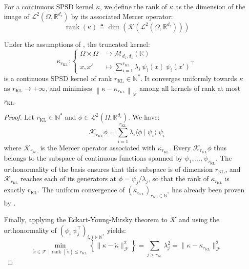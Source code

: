 \begin{proposition}\label{th:reduced_rank}
	For a continuous SPSD kernel $\kappa$, we define the rank of $\kappa$ as the dimension of the image of $\mathcal{L}^2(\Omega,\mathbb{R}^{d_z})$ by its associated Mercer operator:
	\begin{equation}
		\operatorname{rank}(\kappa)\triangleq\operatorname{dim}\left(\mathcal{K}\left(\mathcal{L}^2(\Omega,\mathbb{R}^{d_z})\right)\right)
	\end{equation}

	Under the assumptions of , the truncated kernel:
	\begin{equation}
		\kappa_{r_{\mathrm{KL}}}:\left\{\begin{aligned}
		\Omega\times\Omega&\to\mathcal{M}_{d_z,d_z}(\mathbb{R})\\
		x,x'&\mapsto\sum_{i=1}^{r_{\mathrm{KL}}}\lambda_i\:\psi_i(x)\:\psi_i(x')^\top
		\end{aligned}\right.
	\end{equation}
	is a continuous SPSD kernel of rank $r_{\mathrm{KL}}\in\mathbb{N}^*$. It converges uniformly towards $\kappa$ as $r_{\mathrm{KL}}\to+\infty$, and minimises $\left\|\kappa-\kappa_{r_{\mathrm{KL}}}\right\|_{\mathcal{F}}$ among all kernels of rank at most $r_{\mathrm{KL}}$.
\end{proposition}

\begin{proof}
	Let $r_{\mathrm{KL}}\in\mathbb{N}^*$ and $\phi\in\mathcal{L}^2(\Omega,\mathbb{R}^{d_z})$. We have:
	\begin{equation}
		\mathcal{K}_{r_{\mathrm{KL}}}\phi=\sum_{i=1}^{r_{\mathrm{KL}}}\lambda_i\langle\phi\mid\psi_i\rangle\:\psi_i
	\end{equation}
	where $\mathcal{K}_{r_{\mathrm{KL}}}$ is the Mercer operator associated with $\kappa_{r_{\mathrm{KL}}}$. Every $\mathcal{K}_{r_{\mathrm{KL}}}\phi$ thus belongs to the subspace of continuous functions spanned by $\psi_1,\dots,\psi_{r_{\mathrm{KL}}}$. The orthonormality of the basis ensures that this subspace is of dimension $r_{\mathrm{KL}}$, and $\mathcal{K}_{r_{\mathrm{KL}}}$ reaches each of its generators at $\phi=\psi_j/\lambda_j$, so that the rank of $\kappa_{r_{\mathrm{KL}}}$ is exactly $r_{\mathrm{KL}}$. The uniform convergence of $(\kappa_{r_{\mathrm{KL}}})_{r_{\mathrm{KL}}\in\mathbb{N}^*}$ has already been proven by .

	Finally, applying the Eckart-Young-Mirsky theorem \cite{bib:Eckart-Young,bib:Mirsky} to $\mathcal{K}$ and using the orthonormality of $(\psi_i\:\psi_j^\top)_{i,j\in\mathbb{N}^*}$ yields:
	\begin{equation}
		\underset{\tilde{\kappa}\in\mathcal{F}\mid\operatorname{rank}(\tilde{\kappa})\leq r_{\mathrm{KL}}}{\min}\left\{\|\kappa-\tilde{\kappa}\|_{\mathcal{F}}^2\right\}=\sum_{j>r_{\mathrm{KL}}}\lambda_j^2=\|\kappa-\kappa_{r_{\mathrm{KL}}}\|_{\mathcal{F}}^2
	\end{equation}
\end{proof}

